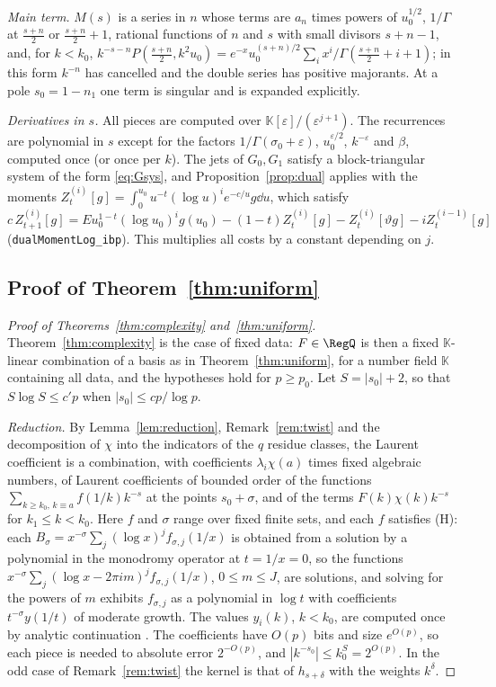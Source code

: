 \begin{small}
\emph{Main term.} $M(s)$ is a series in $n$ whose terms are $a_n$ times powers of $u_0^{1/2}$, $1/\Gamma$ at
$\frac{s+n}2$ or $\frac{s+n}2 + 1$, rational functions of $n$ and $s$ with small divisors $s + n - 1$, and, for $k < k_0$,
$k^{-s-n}P(\frac{s+n}2, k^2u_0) = e^{-x}u_0^{(s+n)/2}\sum_ix^i/\Gamma(\frac{s+n}2+i+1)$; in this form $k^{-n}$ has
cancelled and the double series has positive majorants. At a pole $s_0 = 1 - n_1$ one term is singular and is
expanded explicitly.

\emph{Derivatives in $s$.} All pieces are computed over $\mathbb K[\varepsilon]/(\varepsilon^{j+1})$. The recurrences
are polynomial in $s$ except for the factors $1/\Gamma(\sigma_0 + \varepsilon)$, $u_0^{\varepsilon/2}$, $k^{-\varepsilon}$
and $\beta$, computed once (or once per $k$). The jets of $G_0, G_1$ satisfy a block-triangular system of the form
\eqref{eq:Gsys}, and Proposition~\ref{prop:dual} applies with the moments
$Z^{(i)}_t[g] = \int_0^{u_0}u^{-t}(\log u)^ie^{-c/u}g\dd u$, which satisfy
$c\,Z^{(i)}_{t+1}[g] = Eu_0^{1-t}(\log u_0)^ig(u_0) - (1-t)Z^{(i)}_t[g] - Z^{(i)}_t[\vartheta g] - iZ^{(i-1)}_t[g]$
(\nolinkurl{dualMomentLog_ibp}).
This multiplies all costs by a constant depending on $j$.

\subsection{Proof of Theorem~\ref{thm:uniform}}\label{app:uniform}
\begin{proof}[Proof of Theorems~\ref{thm:complexity} and~\ref{thm:uniform}]
Theorem~\ref{thm:complexity} is the case of fixed data: $F \in \RegQ$ is then a fixed $\mathbb K$-linear combination of
a basis as in Theorem~\ref{thm:uniform}, for a number field $\mathbb K$ containing all data, and the hypotheses hold
for $p \ge p_0$. Let $S = |s_0| + 2$, so that $S\log S \le c'p$ when $|s_0| \le cp/\log p$.

\emph{Reduction.} By Lemma~\ref{lem:reduction}, Remark~\ref{rem:twist} and the decomposition of $\chi$ into the
indicators of the $q$ residue classes, the Laurent coefficient is a combination, with coefficients $\lambda_i\chi(a)$
times fixed algebraic numbers, of Laurent coefficients of bounded order of the functions
$\sum_{k\ge k_0,\,k\equiv a}f(1/k)k^{-s}$ at the points $s_0 + \sigma$, and of the terms $F(k)\chi(k)k^{-s}$ for
$k_1 \le k < k_0$. Here $f$ and $\sigma$ range over fixed finite sets, and each $f$ satisfies (H): each
$B_\sigma = x^{-\sigma}\sum_j(\log x)^jf_{\sigma,j}(1/x)$ is obtained from a solution by a polynomial in the
monodromy operator at $t = 1/x = 0$, so the functions $x^{-\sigma}\sum_j(\log x - 2\pi im)^jf_{\sigma,j}(1/x)$,
$0 \le m \le J$, are solutions, and solving for the powers of $m$ exhibits $f_{\sigma,j}$ as a polynomial in
$\log t$ with coefficients $t^{-\sigma}y(1/t)$ of moderate growth. The values $y_i(k)$, $k < k_0$, are computed once
by analytic continuation \cite{CC90,vdH99}. The coefficients have $O(p)$ bits and size $e^{O(p)}$, so each piece is
needed to absolute error $2^{-O(p)}$, and $|k^{-s_0}| \le k_0^S = 2^{O(p)}$. In the odd case of Remark~\ref{rem:twist}
the kernel is that of $h_{s+\delta}$ with the weights $k^\delta$.


\end{proof}
\end{small}
